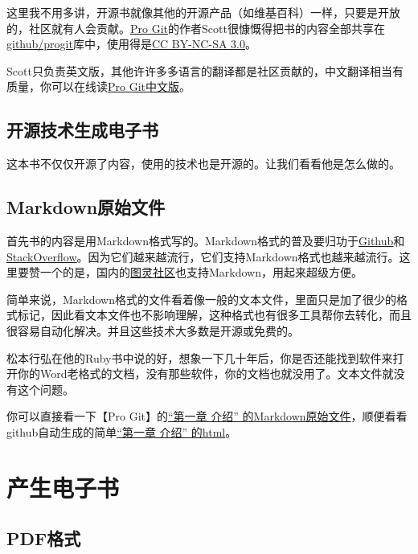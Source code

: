 \documentclass[a4paper]{book}
\begin{document}
这里我不用多讲，开源书就像其他的开源产品（如维基百科）一样，只要是开放的，社区就有人会贡献。\href{http://progit.org/}{Pro Git}的作者Scott很慷慨得把书的内容全部共享在\href{http://github.com/progit/progit}{github/progit}库中，使用得是\href{http://creativecommons.org/licenses/by-nc-sa/3.0/us/}{CC BY-NC-SA 3.0}。

Scott只负责英文版，其他许许多多语言的翻译都是社区贡献的，中文翻译相当有质量，你可以在线读\href{http://progit.org/book/zh/}{Pro Git中文版}。

\subsection{开源技术生成电子书}

这本书不仅仅开源了内容，使用的技术也是开源的。让我们看看他是怎么做的。

\subsection{Markdown原始文件}

首先书的内容是用Markdown格式写的。Markdown格式的普及要归功于\href{github.com}{Github}和\href{http://stackoverflow.com/}{StackOverflow}。因为它们越来越流行，它们支持Markdown格式也越来越流行。这里要赞一个的是，国内的\href{http://www.ituring.com.cn/}{图灵社区}也支持Markdown，用起来超级方便。

简单来说，Markdown格式的文件看着像一般的文本文件，里面只是加了很少的格式标记，因此看文本文件也不影响理解，这种格式也有很多工具帮你去转化，而且很容易自动化解决。并且这些技术大多数是开源或免费的。

松本行弘在他的Ruby书中说的好，想象一下几十年后，你是否还能找到软件来打开你的Word老格式的文档，没有那些软件，你的文档也就没用了。文本文件就没有这个问题。

你可以直接看一下【Pro Git】的\href{https://raw.github.com/progit/progit/master/zh/01-introduction/01-chapter1.markdown}{“第一章 介绍” 的Markdown原始文件}，顺便看看github自动生成的简单\href{https://github.com/progit/progit/blob/master/zh/01-introduction/01-chapter1.markdown}{“第一章 介绍” 的html}。

\section{产生电子书}

\subsection{PDF格式}
\end{document}
